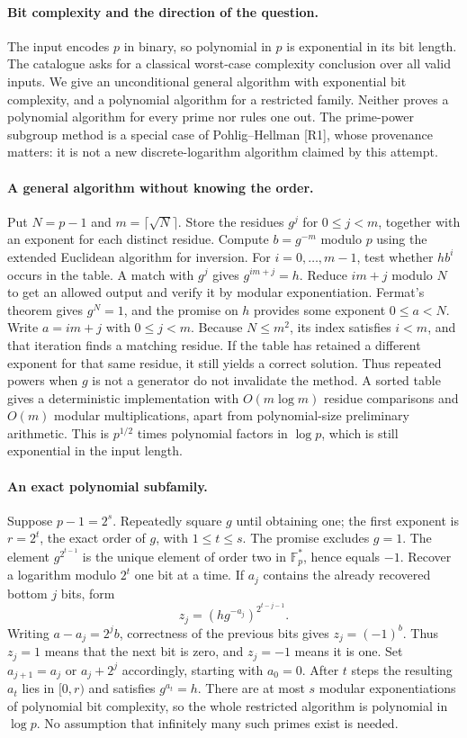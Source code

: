 \documentclass[11pt,a4paper]{article}
\begin{document}
\paragraph{Bit complexity and the direction of the question.}
The input encodes $p$ in binary, so polynomial in $p$ is
exponential in its bit length. The catalogue asks for a
classical worst-case complexity conclusion over all valid
inputs. We give an unconditional general algorithm with
exponential bit complexity, and a polynomial algorithm for
a restricted family. Neither proves a polynomial algorithm
for every prime nor rules one out. The prime-power subgroup
method is a special case of Pohlig--Hellman [R1], whose
provenance matters: it is not a new discrete-logarithm
algorithm claimed by this attempt.

\paragraph{A general algorithm without knowing the order.}
Put $N=p-1$ and $m=\lceil\sqrt N\rceil$. Store the residues
$g^j$ for $0\le j<m$, together with an exponent for each
distinct residue. Compute $b=g^{-m}$ modulo $p$ using
the extended Euclidean algorithm for inversion. For
$i=0,\ldots,m-1$, test whether $hb^i$ occurs in the table.
A match with $g^j$ gives $g^{im+j}=h$. Reduce $im+j$
modulo $N$ to get an allowed output and verify it by
modular exponentiation.
Fermat's theorem gives $g^N=1$, and the promise on $h$
provides some exponent $0\le a<N$. Write $a=im+j$
with $0\le j<m$. Because $N\le m^2$, its index satisfies
$i<m$, and that iteration finds a matching residue.
If the table has retained a different exponent for that
same residue, it still yields a correct solution.
Thus repeated powers when $g$ is not a generator do
not invalidate the method. A sorted table gives a
deterministic implementation with $O(m\log m)$ residue
comparisons and $O(m)$ modular multiplications, apart
from polynomial-size preliminary arithmetic. This is
$p^{1/2}$ times polynomial factors in $\log p$, which
is still exponential in the input length.

\paragraph{An exact polynomial subfamily.}
Suppose $p-1=2^s$. Repeatedly square $g$ until obtaining
one; the first exponent is $r=2^t$, the exact order of
$g$, with $1\le t\le s$. The promise excludes $g=1$.
The element $g^{2^{t-1}}$ is the unique element of order
two in $\mathbb F_p^*$, hence equals $-1$.
Recover a logarithm modulo $2^t$ one bit at a time.
If $a_j$ contains the already recovered bottom $j$
bits, form
\[
 z_j=(h g^{-a_j})^{2^{t-j-1}}.
\]
Writing $a-a_j=2^j b$, correctness of the previous
bits gives $z_j=(-1)^b$. Thus $z_j=1$ means that
the next bit is zero, and $z_j=-1$ means it is one.
Set $a_{j+1}=a_j$ or $a_j+2^j$ accordingly, starting
with $a_0=0$. After $t$ steps the resulting $a_t$
lies in $[0,r)$ and satisfies $g^{a_t}=h$.
There are at most $s$ modular exponentiations of
polynomial bit complexity, so the whole restricted
algorithm is polynomial in $\log p$. No assumption
that infinitely many such primes exist is needed.
\end{document}
